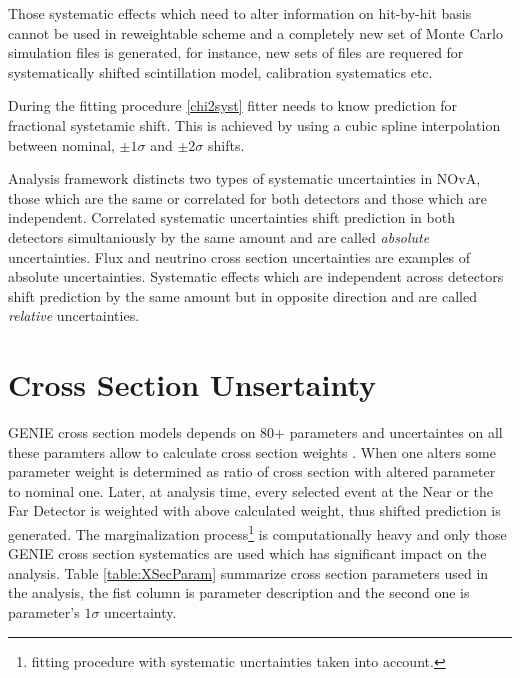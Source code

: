 Those systematic effects which need to alter information on hit-by-hit basis cannot be used in reweightable scheme 
and a completely new set of Monte Carlo simulation files is generated, for instance, new sets of files are requered for 
systematically shifted scintillation model, calibration systematics etc. 

During the fitting procedure \ref{chi2syst} fitter needs to know prediction for fractional systetamic shift. This is 
achieved by using a cubic spline interpolation between nominal, $\pm 1\sigma$ and $\pm 2\sigma$ shifts. 

Analysis framework distincts two types of systematic uncertainties in NOvA, those which are the same or correlated for 
both detectors and those which are independent. Correlated systematic uncertainties shift prediction in both detectors
simultaniously by the same amount and are called \textit{absolute} uncertainties. Flux and neutrino cross section 
uncertainties are examples of absolute uncertainties. Systematic effects which are independent across detectors 
shift prediction by the same amount but in opposite direction and are called \textit{relative} uncertainties.  

\section{Cross Section Unsertainty}
GENIE cross section models depends on 80+ parameters and uncertaintes on all these paramters allow to calculate cross
section weights \cite{GENIE}. When one alters some parameter weight is determined as ratio of cross section with altered 
parameter to nominal one. Later, at analysis time, every selected event at the Near or the Far Detector is weighted with 
above calculated weight, thus shifted prediction is generated. The marginalization process\footnote{fitting procedure with 
systematic uncrtainties taken into account.} is computationally heavy and only those GENIE cross section systematics are 
used which has significant impact on the analysis. Table \ref{table:XSecParam} summarize cross section parameters used in
the analysis, the fist column is parameter description and the second one is parameter's $1\sigma$ uncertainty. 

